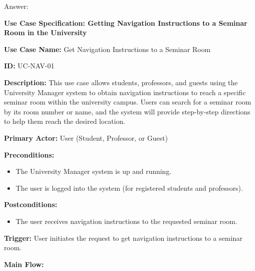 \documentclass[article,onecolumn]{IEEEtran}
\begin{document}
Answer:
\begin{framed}
	\small
	\textbf{Use Case Specification: Getting Navigation Instructions to a Seminar Room in the University}
	
	\textbf{Use Case Name:} Get Navigation Instructions to a Seminar Room
	
	\textbf{ID:} UC-NAV-01
	
	\textbf{Description:} This use case allows students, professors, and guests using the University Manager system to obtain navigation instructions to reach a specific seminar room within the university campus. Users can search for a seminar room by its room number or name, and the system will provide step-by-step directions to help them reach the desired location.
	
	\textbf{Primary Actor:} User (Student, Professor, or Guest)
	
	\textbf{Preconditions:}
	
	\begin{itemize}
		\item The University Manager system is up and running.
		\item The user is logged into the system (for registered students and professors).
	\end{itemize}
	
	\textbf{Postconditions:}
	
	\begin{itemize}
		\item The user receives navigation instructions to the requested seminar room.
	\end{itemize}
	
	\textbf{Trigger:} User initiates the request to get navigation instructions to a seminar room.
	
	\textbf{Main Flow:}
	

\end{framed}
\end{document}
